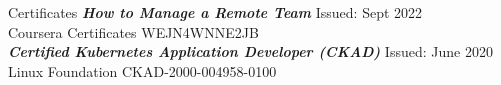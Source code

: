\begin{section}{Certificates}
    {\textsl \textbf{How to Manage a Remote Team}} \hfill Issued: Sept 2022\\
    Coursera Certificates \hfill WEJN4WNNE2JB \\

    {\textsl \textbf{Certified Kubernetes Application Developer (CKAD)}} \hfill Issued: June 2020\\
    Linux Foundation \hfill CKAD-2000-004958-0100 \\
\end{section}